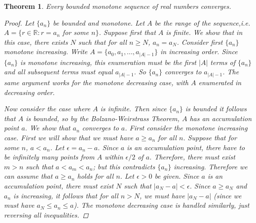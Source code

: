\documentclass[11pt,a4paper]{report}
\theoremstyle{plain}
\newtheorem{thm}{Theorem}[section]
\theoremstyle{definition}
\theoremstyle{remark}
\begin{document}
\begin{thm}
Every bounded monotone sequence of real numbers converges.
\begin{proof}
Let $\{a_n\}$ be bounded and monotone. Let $A$ be the range of the sequence,i.e. $A = \{r \in \mathbb{R}: r = a_n$ for some $n \}$.  Suppose first that $A$ is finite.  We show that in this case, there exists $N$ such that for all $n \geq N$, $a_n = a_N$.  Consider first $\{a_n\}$ monotone increasing. Write $A = \{a_0, a_1, ..., a_{|A| - 1}\}$ in increasing order.  Since $\{a_n\}$ is monotone increasing, this enumeration must be the first $|A|$ terms of $\{a_n\}$ and all subsequent terms must equal $a_{|A| - 1}$.  So $\{a_n\}$ converges to  $a_{|A| - 1}$.  The same argument works for the monotone decreasing case, with $A$ enumerated in decreasing order.

Now consider the case where $A$ is infinite.  Then since $\{a_n\}$ is bounded it follows that $A$ is bounded, so by the Bolzano-Weirstrass Theorem, $A$ has an accumulation point $a$.  We show that ${a_n}$ converges to $a$.  First consider the monotone increasing case.  First we will show that we must have $a \geq a_n$ for all $n$.  Suppose that for some $n$, $a < a_n$.  Let $\epsilon = a_n - a$.  Since $a$ is an accumulation point, there have to be infinitely many points from $A$ within $\epsilon /2$ of $a$.  Therefore, there must exist $m > n$ such that $a < a_m < a_n$; but this contradicts $\{a_n\}$ increasing.  Therefore we can assume that $a \geq a_n$ holds for all $n$.  Let $\epsilon > 0$ be given. Since $a$ is an accumulation point, there must exist $N$ such that $|a_N - a| < \epsilon$.  Since $a \geq a_N$ and ${a_n}$ is increasing, it follows that for all $n > N$, we must have
$|a_N - a|$ (since we must have $a_N \leq a_n \leq a$).  The monotone decreasing case is handled similarly, just reversing all inequalities.
\end{proof}
\end{thm}
\end{document}
